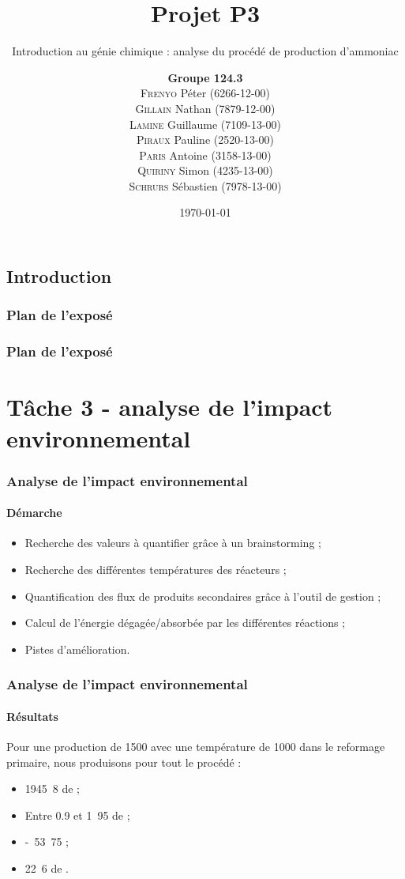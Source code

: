 \documentclass{beamer}
\title{Projet P3}
\subtitle{Introduction au génie chimique : analyse du procédé de production d'ammoniac}
\author{\textbf{Groupe 124.3}\\
\textsc{Frenyo} Péter (6266-12-00)\\
\textsc{Gillain} Nathan (7879-12-00)\\
\textsc{Lamine} Guillaume (7109-13-00)\\
\textsc{Piraux} Pauline (2520-13-00)\\
\textsc{Paris} Antoine (3158-13-00)\\
\textsc{Quiriny} Simon (4235-13-00)\\
\textsc{Schrurs} Sébastien (7978-13-00)}
\date{\today}
\begin{document}
 
 
	\begin{frame} 
		\titlepage 
	\end{frame} 
	
	\begin{frame}
		\section{Introduction}
		\frametitle{Plan de l'exposé}
		\tableofcontents[currentsubsection,sectionstyle=show/shaded,subsectionstyle=show/shaded/hide]
	\end{frame}
	
	\begin{frame}
		\frametitle{Plan de l'exposé}
		\section{Tâche 3 - analyse de l'impact environnemental}
		\tableofcontents[currentsubsection,sectionstyle=show/shaded,subsectionstyle=show/shaded/hide]
	\end{frame}
	
	\begin{frame}
	\frametitle{Analyse de l'impact environnemental}
	\framesubtitle{Démarche}
	\begin{itemize}
		\item Recherche des valeurs à quantifier grâce à un brainstorming ;
		\item Recherche des différentes températures des réacteurs ;
		\item Quantification des flux de produits secondaires grâce à l'outil de gestion ;
		\item Calcul de l'énergie dégagée/absorbée par les différentes réactions ;
		\item Pistes d'amélioration.
	\end{itemize}
	\end{frame}

	\begin{frame}
	\frametitle{Analyse de l'impact environnemental}
	\framesubtitle{Résultats}
	Pour une production de \unit{1500}{\ton\per\dday} avec une température 
	de \unit{1000}{\kelvin} dans le reformage primaire, nous produisons pour tout le procédé :
	\begin{itemize}
		\item \unit{1945.8}{\ton\per\dday} de \chemform{CO_2} ;
		\item Entre 0.9 et \unit{1.95}{\ton\per\dday} de \chemform{NO_x} ;
		\item \unit{-53.75}{\kilo\joule\per\dday} ;
		\item \unit{22.6}{\ton\per\dday} de \chemform{Ar}.
	\end{itemize}
	\end{frame}
\end{document}
